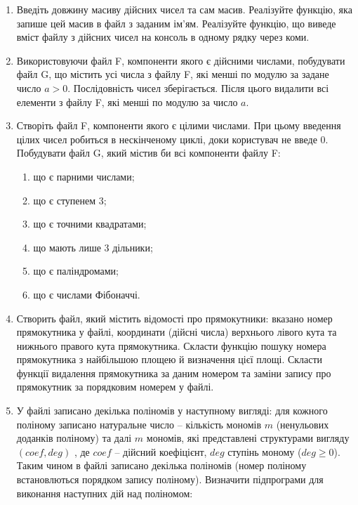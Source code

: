 \documentclass[a5paper,titlepage,openany,twoside,draft]{book_unv}%
\makeatletter
\newcommand{\xslalph}[1]{\expandafter\@xslalph\csname c@#1\endcsname}
\newcommand{\@xslalph}[1]{%
    \ifcase#1\or а\or б\or в\or г\or д\or e\or є\or ж\or з\or i%
    \or й\or к\or л\or м\or н\or о\or п\or р\or с\or т%
    \or у\or ф\or х\or ц\or ч\or ш\or ю\or я\or аа\or бб\or вв%
    \else\@ctrerr\fi%
}
\makeatother
\begin{document}
\begin{enumerate}
\def\labelenumi{\arabic{enumi})}

\item
Введіть довжину масиву дійсних чисел та сам масив. Реалізуйте функцію, яка 
запише цей масив в файл з заданим ім'ям. Реалізуйте функцію, що виведе вміст 
файлу з дійсних чисел на консоль в одному рядку через коми. 


\item
  Використовуючи файл F, компоненти якого є дійсними числами, побудувати
  файл G, що містить усі числа з файлу F, які менші по модулю за задане число $a>0$.
  Послідовність чисел зберігається. Після цього видалити всі елементи з файлу F, 
  які менші по модулю за число $a$.

\item
  Створіть файл F, компоненти якого є цілими числами. При цьому введення
цілих чисел робиться в нескінченому циклі, доки користувач не введе 0. 
 Побудувати файл G, який містив би всі компоненти файлу F:
\begin{enumerate}[label=\xslalph*)]
\item
що є парними числами; 
\item
 що є ступенем 3;
\item
що є точними квадратами; 
\item
що мають лише 3 дільники; 
\item
що є паліндромами;
\item
що є числами Фібоначчі.
\end{enumerate}


\item
  Створить файл, який містить відомості про прямокутники: вказано номер
  прямокутника у файлі, координати (дійсні числа) верхнього лівого кута та
  нижнього правого кута прямокутника. Скласти функцію пошуку номера
  прямокутника з найбільшою площею й визначення цієї площі.
  Скласти функції видалення прямокутника за даним номером та 
заміни запису про прямокутник за порядковим номерем у файлі.

\item
  У файлі записано декілька поліномів у наступному вигляді:
для кожного поліному записано натуральне число -- кількість
мономів $m$ (ненульових доданків поліному) та далі $m$ мономів, які
представлені структурами вигляду $(coef, deg)$ , де $coef$ -- дійсний коефіцієнт,
$deg$ ступінь моному ($deg \ge 0$). 
Таким чином в файлі записано декілька поліномів (номер поліному встановлються
порядком запису поліному).
Визначити підпрограми для виконання наступних дій над поліномом:


\end{enumerate}
\end{document}
